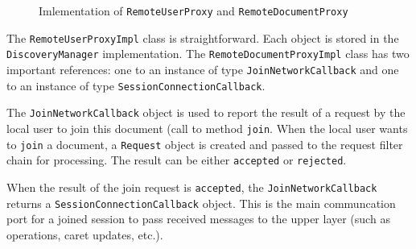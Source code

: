 \begin{figure}[H]
 \centering
 \caption{Imlementation of \texttt{RemoteUserProxy} and \texttt{RemoteDocumentProxy}}
 \label{fig:network.protocol.userimpl.uml}
\end{figure}

The \texttt{RemoteUserProxyImpl} class is straightforward. Each object is stored in the \texttt{DiscoveryManager} implementation. The \texttt{RemoteDocumentProxyImpl} class has two important references: one to an instance of type \texttt{JoinNetworkCallback} and one to an instance of type \texttt{SessionConnectionCallback}. 

The \texttt{JoinNetworkCallback} object is used to report the result of a request by the local user to join this document (call to method \texttt{join}. When the local user wants to \texttt{join} a document, a \texttt{Request} object is created and passed to the request filter chain for processing. The result can be either \texttt{accepted} or \texttt{rejected}.

When the result of the join request is  \texttt{accepted}, the \texttt{JoinNetworkCallback} returns a \texttt{Session\-Connection\-Callback} object. This is the main communcation port for a joined session to pass received messages to the upper layer (such as operations, caret updates, etc.).


